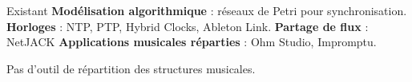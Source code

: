 \begin{block}{Existant}
\textbf{Modélisation algorithmique} : réseaux de Petri pour synchronisation. 
\textbf{Horloges} : NTP, PTP, Hybrid Clocks, Ableton Link.
\textbf{Partage de flux} : NetJACK
\textbf{Applications musicales réparties} : Ohm Studio, Impromptu.

Pas d'outil de répartition des structures musicales.
\end{block}